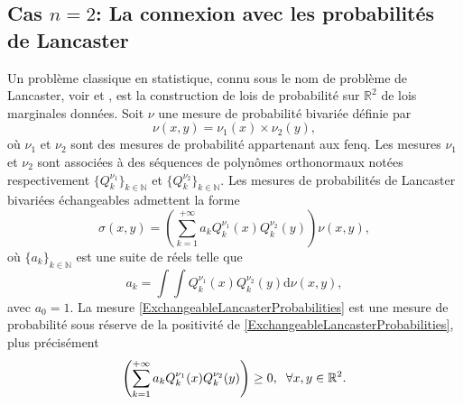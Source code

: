 \subsection{Cas $n=2$: La connexion avec les probabilités de  Lancaster}

Un problème classique en statistique, connu sous le nom de problème de Lancaster, voir \citet{La58} et \citet{La05}, est la construction de lois de probabilité sur $\mathbb{R}^{2}$ de lois marginales données. Soit $\nu$ une mesure de probabilité bivariée définie par
\begin{equation}\label{BivariateFENQMeasure}
\nu(x,y)=\nu_{1}(x)\times\nu_{2}(y),
\end{equation}
où $\nu_{1}$ et $\nu_{2}$ sont des mesures de probabilité appartenant aux \gls{fenq}. Les mesures $\nu_{1}$ et $\nu_{2}$ sont associées à des séquences de polynômes orthonormaux notées respectivement $\{Q^{\nu_{1}}_{k}\}_{k\in\mathbb{N}}$ et $\{Q^{\nu_{2}}_{k}\}_{k\in\mathbb{N}}$. Les mesures de probabilités de Lancaster bivariées échangeables admettent la forme
\begin{equation}\label{ExchangeableLancasterProbabilities}
\sigma(x,y)=\left(\sum_{k=1}^{+\infty}a_{k}Q^{\nu_{1}}_{k}(x)Q^{\nu_{2}}_{k}(y)\right)\nu(x,y),
\end{equation}
où $\{a_{k}\}_{k\in\mathbb{N}}$ est une suite de réels telle que 
\begin{equation*}
a_{k}=\int\int Q^{\nu_{1}}_{k}(x)Q^{\nu_{2}}_{k}(y)\text{d}\nu(x,y),
\end{equation*} 
avec $a_{0}=1$. La mesure \eqref{ExchangeableLancasterProbabilities} est une mesure de probabilité sous réserve de la positivité de \eqref{ExchangeableLancasterProbabilities}, plus précisément
\begin{equation}\label{LancasterCondition}
\left(\sum_{k=1}^{+\infty}a_{k}Q^{\nu_{1}}_{k}(x)Q^{\nu_{2}}_{k}(y)\right)\geq 0,\hspace{0.2cm} \forall x,y\in\mathbb{R}^{2}.
\end{equation} 
